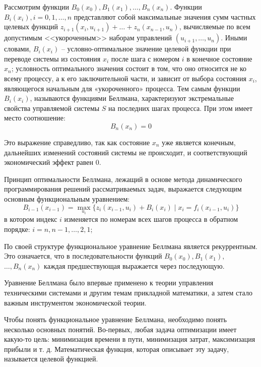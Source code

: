 Рассмотрим функции $B_0(x_0), B_1(x_1), \hdots, B_n(x_n)$. Функции $B_i(x_i), i = 0,1, \hdots, n$ представляют собой максимальные значения сумм частных целевых функций $z_{i+1}(x_i, u_{i+1}) + \hdots +z_n(x_{n−1}, u_n)$, вычисляемые по всем допустимым <<укороченным>> наборам управлений $(u_{i+1}, \hdots,u_n)$. Иными словами, $B_i(x_i)$ -- условно-оптимальное значение целевой функции при переводе системы из состояния $x_i$ после шага с номером $i$ в конечное состояние $x_n$; условность оптимального значения состоит в том, что оно относится не ко всему процессу, а к его заключительной части, и зависит от выбора состояния $x_i$, являющегося начальным для «укороченного» процесса. Тем самым функции $B_i(x_i)$, называются функциями Беллмана, характеризуют экстремальные свойства управляемой системы $S$ на последних шагах процесса. При этом имеет место соотношение:
\begin{equation}
    B_n(x_n) = 0
\end{equation}

Это выражение справедливо, так как состояние $x_n$ уже является конечным, дальнейших изменений состояний системы не происходит, и соответствующий экономический эффект равен 0.

Принцип оптимальности Беллмана, лежащий в основе метода динамического программирования решений рассматриваемых задач, выражается следующим основным функциональным уравнением:
\begin{equation}
    B_{i-1}(x_{i-1}) = \max_{u_i}\{z_i(x_{i-1}, u_i) + B_i(x_i) \; | \; x_i = f_i(x_{i-1}, u_i)\}
\end{equation}
в котором индекс $i$ изменяется по номерам всех шагов процесса в обратном порядке: $i = n, n-1, \hdots , 2, 1$;

По своей структуре функциональное уравнение Беллмана является рекуррентным. Это означается, что в последовательности функций $B_0(x_0), B_1(x_1),$ $\hdots, B_n(x_n)$ каждая предшествующая выражается через последующую.

Уравнение Беллмана было впервые применено к теории управления техническими системами и другим темам прикладной математики, а затем стало важным инструментом экономической теории.

Чтобы понять функциональное уравнение Беллмана, необходимо понять несколько основных понятий. Во-первых, любая задача оптимизации имеет какую-то цель: минимизация времени в пути, минимизация затрат, максимизация прибыли и т. д. Математическая функция, которая описывает эту задачу, называется целевой функцией.

